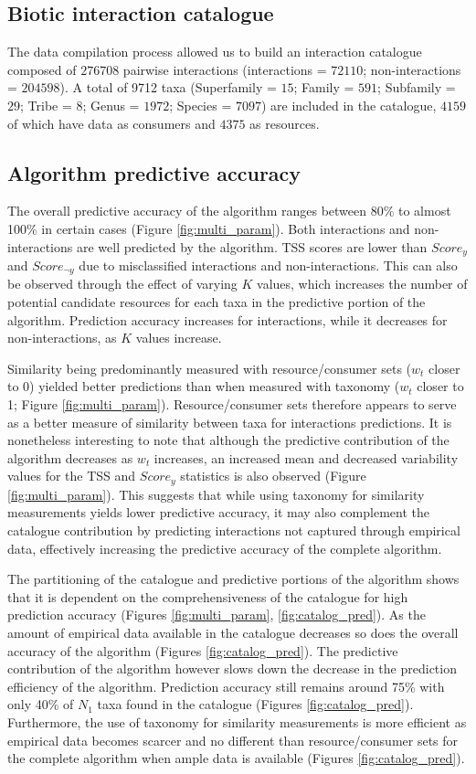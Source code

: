 \documentclass[letterpaper]{article}
\begin{document}
    \subsection{Biotic interaction catalogue}
The data compilation process allowed us to build an interaction catalogue composed of $276708$ pairwise interactions (interactions = $72110$; non-interactions = $204598$). A total of 9712 taxa (Superfamily = $15$; Family = $591$; Subfamily = $29$; Tribe = $8$; Genus = $1972$; Species = $7097$) are included in the catalogue, $4159$ of which have data as consumers and $4375$ as resources.

    \subsection{Algorithm predictive accuracy}
The overall predictive accuracy of the algorithm ranges between 80\% to almost 100\% in certain cases (Figure \ref{fig:multi_param}). Both interactions and non-interactions are well predicted by the algorithm. TSS scores are lower than $Score_y$ and $Score_{\neg y}$ due to misclassified interactions and non-interactions. This can also be observed through the effect of varying $K$ values, which increases the number of potential candidate resources for each taxa in the predictive portion of the algorithm. Prediction accuracy increases for interactions, while it decreases for non-interactions, as $K$ values increase.

Similarity being predominantly measured with resource/consumer sets ($w_t$ closer to 0) yielded better predictions than when measured with taxonomy ($w_t$ closer to 1; Figure \ref{fig:multi_param}). Resource/consumer sets therefore appears to serve as a better measure of similarity between taxa for interactions predictions. It is nonetheless interesting to note that although the predictive contribution of the algorithm decreases as $w_t$ increases, an increased mean and decreased variability values for the TSS and $Score_y$ statistics is also observed (Figure \ref{fig:multi_param}). This suggests that while using taxonomy for similarity measurements yields lower predictive accuracy, it may also complement the catalogue contribution by predicting interactions not captured through empirical data, effectively increasing the predictive accuracy of the complete algorithm.

The partitioning of the catalogue and predictive portions of the algorithm shows that it is dependent on the comprehensiveness of the catalogue for high prediction accuracy (Figures \ref{fig:multi_param}, \ref{fig:catalog_pred}). As the amount of empirical data available in the catalogue decreases so does the overall accuracy of the algorithm (Figures \ref{fig:catalog_pred}). The predictive contribution of the algorithm however slows down the decrease in the prediction efficiency of the algorithm. Prediction accuracy still remains around 75\% with only 40\% of $N_1$ taxa found in the catalogue (Figures \ref{fig:catalog_pred}). Furthermore, the use of taxonomy for similarity measurements is more efficient as empirical data becomes scarcer and no different than resource/consumer sets for the complete algorithm when ample data is available (Figures \ref{fig:catalog_pred}).
\end{document}

